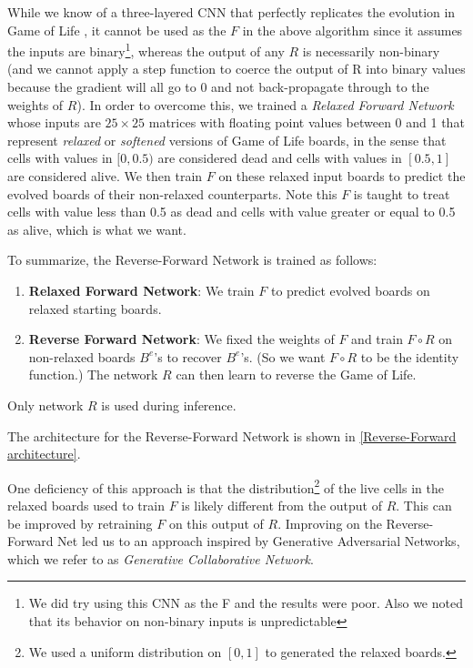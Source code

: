 \documentclass[conference]{IEEEtran}
\newcommand\todo[1]{\textcolor{red}{#1}}
\begin{document}
While we know of a three-layered CNN that perfectly replicates the evolution in Game of Life \cite{b5}, it cannot be used as the $F$ in the above algorithm since it assumes the inputs are binary\footnote{We did try using this CNN as the F and the results were poor. Also we noted that its behavior on non-binary inputs is unpredictable}, whereas the output of any $R$ is necessarily non-binary (and we cannot apply a step function to coerce the output of R into binary values because the gradient will all go to 0 and not back-propagate through to the weights of $R$). In order to overcome this, we trained a \emph{Relaxed Forward Network} whose inputs are $25 \times 25$ matrices with floating point values between 0 and 1 that represent \emph{relaxed} or \emph{softened} versions of Game of Life boards, in the sense that cells with values in $[0, 0.5)$ are considered dead and cells with values in $[0.5, 1]$ are considered alive. We then train $F$ on these relaxed input boards to predict the evolved boards of their non-relaxed counterparts. Note this $F$ is taught to treat cells with value less than 0.5 as dead and cells with value greater or equal to 0.5 as alive, which is what we want.

To summarize, the Reverse-Forward Network is trained as follows:
\begin{enumerate}
    \item \textbf{Relaxed Forward Network}: We train $F$ to predict evolved boards on relaxed starting boards.
    \item \textbf{Reverse Forward Network}: We fixed the weights of $F$ and train $F \circ R$ on non-relaxed boards $B^e$'s to recover $B^e$'s. (So we want $F \circ R$ to be the identity function.) The network $R$ can then learn to reverse the Game of Life.
\end{enumerate}

Only network $R$ is used during inference.

The architecture for the Reverse-Forward Network is shown in \todo{\ref{Reverse-Forward architecture}}.

One deficiency of this approach is that the distribution\footnote{We used a uniform distribution on $[0, 1]$ to generated the relaxed boards.} of the live cells in the relaxed boards used to train $F$ is likely different from the output of $R$. This can be improved by retraining $F$ on this output of $R$. Improving on the Reverse-Forward Net led us to an approach inspired by Generative Adversarial Networks, which we refer to as \emph{Generative Collaborative Network}.
\end{document}
